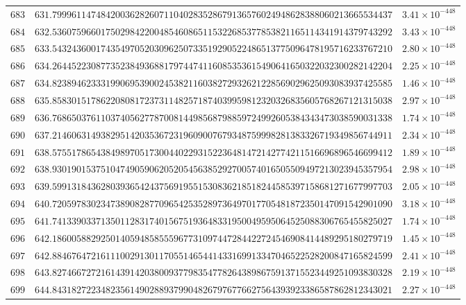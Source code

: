 \documentclass[12pt,reqno]{amsart}
\theoremstyle{remark}
\begin{document}
\begin{longtable}{clc}
$683$ & $631.7999611474842003628260711040283528679136576024948628388060213665534437$ & $3.41\times 10^{-448}$ \\
$684$ & $632.5360759660175029842200485460865115322685377853821165114341914379743292$ & $3.43\times 10^{-448}$ \\
$685$ & $633.5432436001743549705203096250733519290522486513775096478195716233767210$ & $2.80\times 10^{-448}$ \\
$686$ & $634.2644522308773523849368817974474116085353615490641650322032300282142204$ & $2.25\times 10^{-448}$ \\
$687$ & $634.8238946233319906953900245382116038272932621228569029625093083937425585$ & $1.46\times 10^{-448}$ \\
$688$ & $635.8583015178622080817237311482571874039959812320326835605768267121315038$ & $2.97\times 10^{-448}$ \\
$689$ & $636.7686503761103740562778700814498568798859724992605384343473038590031338$ & $1.74\times 10^{-448}$ \\
$690$ & $637.2146063149382951420353672319609007679348759998281383326719349856744911$ & $2.34\times 10^{-448}$ \\
$691$ & $638.5755178654384989705173004402293152236481472142774211516696896546699412$ & $1.89\times 10^{-448}$ \\
$692$ & $638.9301901537510474905906205205456385292700574016505509497213023945357954$ & $2.98\times 10^{-448}$ \\
$693$ & $639.5991318436280393654243756919551530836218518244585397158681271677997703$ & $2.05\times 10^{-448}$ \\
$694$ & $640.7205978302347389082877096542535289736497017705481872350147091542901090$ & $3.18\times 10^{-448}$ \\
$695$ & $641.7413390337135011283174015675193648331950049595064525088306765455825027$ & $1.74\times 10^{-448}$ \\
$696$ & $642.1860058829250140594858555967731097447284422724546908414489295180279719$ & $1.45\times 10^{-448}$ \\
$697$ & $642.8846764721611100291301170551465441433169913347046522528200847165824599$ & $2.41\times 10^{-448}$ \\
$698$ & $643.8274667272161439142038009377983547782643898675913715523449251093830328$ & $2.19\times 10^{-448}$ \\
$699$ & $644.8431827223482356149028893799048267976776627564393923386587862812343021$ & $2.27\times 10^{-448}$ \\

\end{longtable}
\end{document}
